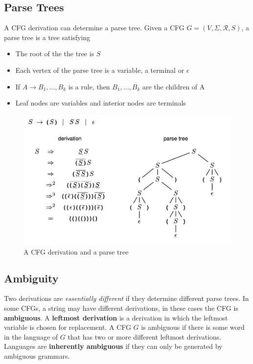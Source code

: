 \documentclass{article}
\begin{document}
    \subsection{Parse Trees}
    A CFG derivation can determine a parse tree. Given a CFG $G = (V,\Sigma,\mathcal{R},S)$, a parse tree is a tree satisfying
    \begin{itemize}
        \item The root of the the tree is $S$
        \item Each vertex of the parse tree is a variable, a terminal or $\epsilon$
        \item If $A \to B_1, \ldots, B_k$ is a rule, then $B_1, \ldots, B_k$ are the children of A
        \item Leaf nodes are variables and interior nodes are terminals
    \end{itemize}
    \begin{figure}[h]
        \centering
        \includegraphics[scale=0.5]{images/parsetree.png}
        \caption{A CFG derivation and a parse tree}
        \label{fig:parsetree}
    \end{figure}
    \subsection{Ambiguity}
    Two derivations are \textit{essentially different} if they determine different parse trees. In some CFGs, a string may have different derivations, in these cases the CFG is \textbf{ambiguous}. A \textbf{leftmost derivation} is a derivation in which the leftmost variable is chosen for replacement. A CFG $G$ is ambiguous if there is some word in the language of $G$ that has two or more different leftmost derivations. Languages are \textbf{inherently ambiguous} if they can only be generated by ambiguous grammars. 
\end{document}
